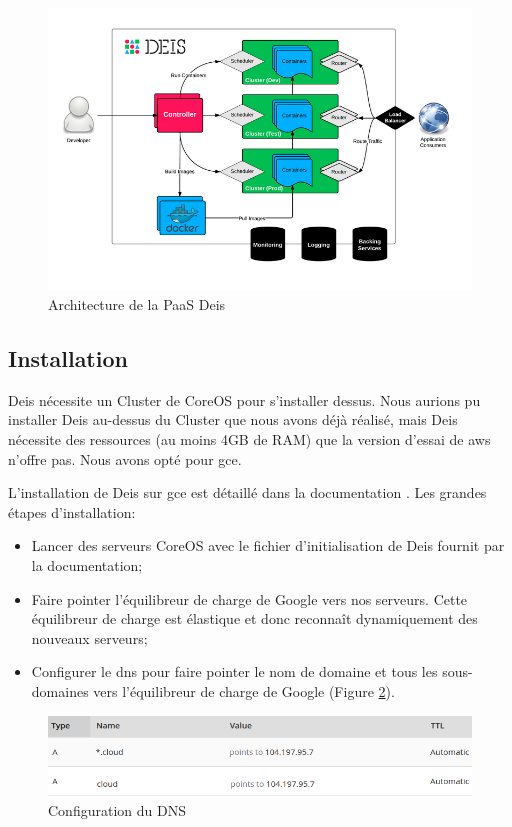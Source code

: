 \begin{onehalfspace}
\begin{figure}[H]
\centering
\includegraphics [scale=0.6]{chapitre5/assets/deis-architecture}
\caption{Architecture de la PaaS Deis}
\label{fig:deis-architecture}
\end{figure}


\subsection{Installation}


Deis nécessite un Cluster de CoreOS pour s'installer dessus. Nous aurions pu installer Deis au-dessus du Cluster que nous avons déjà réalisé, mais Deis nécessite des ressources (au moins 4GB de RAM) que la version d’essai de \acrshort{aws} n'offre pas. Nous avons opté pour \acrshort{gce}.

L'installation de Deis sur \acrshort{gce} est détaillé dans la documentation \cite{deis-gce}. Les grandes étapes d'installation:
\begin{itemize}
	\item Lancer des serveurs CoreOS avec le fichier d'initialisation de Deis fournit par la documentation;
	\item Faire pointer l'équilibreur de charge de Google vers nos serveurs. Cette équilibreur de charge est élastique et donc reconnaît dynamiquement des nouveaux serveurs;
	\item Configurer le \acrshort{dns} pour faire pointer le nom de domaine et tous les sous-domaines vers l'équilibreur de charge de Google (Figure \ref{fig:dns}).
\end{itemize}

\begin{figure}[H]
\centering
\includegraphics [scale=0.55]{chapitre5/assets/dns}
\caption{Configuration du DNS}
\label{fig:dns}
\end{figure}



\end{onehalfspace}
